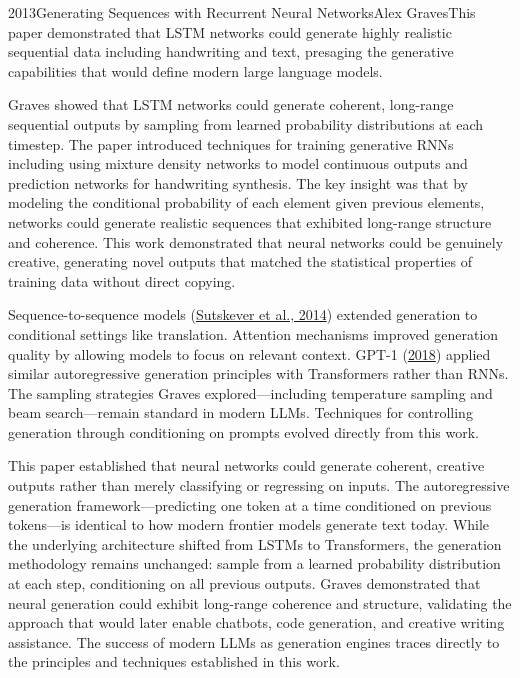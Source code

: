 
\begin{papersummary}{2013}{Generating Sequences with Recurrent Neural Networks}{Alex Graves}{This paper demonstrated that LSTM networks could generate highly realistic sequential data including handwriting and text, presaging the generative capabilities that would define modern large language models.}

Graves showed that LSTM networks could generate coherent, long-range sequential outputs by sampling from learned probability distributions at each timestep. The paper introduced techniques for training generative RNNs including using mixture density networks to model continuous outputs and prediction networks for handwriting synthesis. The key insight was that by modeling the conditional probability of each element given previous elements, networks could generate realistic sequences that exhibited long-range structure and coherence. This work demonstrated that neural networks could be genuinely creative, generating novel outputs that matched the statistical properties of training data without direct copying.

Sequence-to-sequence models (\hyperref[paper:sutskever-2014]{Sutskever et al., 2014}) extended generation to conditional settings like translation. Attention mechanisms improved generation quality by allowing models to focus on relevant context. GPT-1 (\hyperref[paper:radford-2018]{2018}) applied similar autoregressive generation principles with Transformers rather than RNNs. The sampling strategies Graves explored—including temperature sampling and beam search—remain standard in modern LLMs. Techniques for controlling generation through conditioning on prompts evolved directly from this work.

This paper established that neural networks could generate coherent, creative outputs rather than merely classifying or regressing on inputs. The autoregressive generation framework—predicting one token at a time conditioned on previous tokens—is identical to how modern frontier models generate text today. While the underlying architecture shifted from LSTMs to Transformers, the generation methodology remains unchanged: sample from a learned probability distribution at each step, conditioning on all previous outputs. Graves demonstrated that neural generation could exhibit long-range coherence and structure, validating the approach that would later enable chatbots, code generation, and creative writing assistance. The success of modern LLMs as generation engines traces directly to the principles and techniques established in this work.

\end{papersummary}
